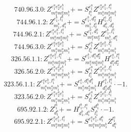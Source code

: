 \documentclass[letterpaper,10pt,fleqn,leqno,onecolumn]{article}
\begin{document}
\begin{equation} \;\;\;\;\;\;  740.96.3.0: Z^{e_{1}^{a}e_{2}^{a}e_{1}^{b}}_{m_{1}^{a}m_{2}^{a}m_{1}^{b}}+=S^{e_{1}^{a}}_{l_{1}^{a}}Z^{e_{2}^{a}e_{1}^{b},l_{1}^{a}}_{m_{1}^{a}m_{2}^{a}m_{1}^{b}} \end{equation}
\begin{equation} \;\;\;\;\;\;  744.96.1.2: Z^{e_{1}^{b},l_{1}^{a}}_{m_{1}^{b},d_{1}^{a}}+=S^{e_{1}^{b},d_{2}^{a}}_{m_{1}^{b},l_{2}^{a}}H^{l_{1}^{a},l_{2}^{a}}_{d_{1}^{a},d_{2}^{a}} \end{equation}
\begin{equation} \;\;\;\;\;\;  744.96.2.1: Z^{e_{1}^{a}e_{1}^{b},l_{1}^{a}}_{m_{1}^{a}m_{2}^{a}m_{1}^{b}}+=S^{e_{1}^{a},d_{1}^{a}}_{m_{1}^{a}m_{2}^{a}}Z^{e_{1}^{b},l_{1}^{a}}_{m_{1}^{b},d_{1}^{a}} \end{equation}
\begin{equation} \;\;\;\;\;\;  744.96.3.0: Z^{e_{1}^{a}e_{2}^{a}e_{1}^{b}}_{m_{1}^{a}m_{2}^{a}m_{1}^{b}}+=S^{e_{1}^{a}}_{l_{1}^{a}}Z^{e_{2}^{a}e_{1}^{b},l_{1}^{a}}_{m_{1}^{a}m_{2}^{a}m_{1}^{b}} \end{equation}
\begin{equation} \;\;\;\;\;\;  326.56.1.1: Z^{e_{1}^{a}e_{1}^{b},l_{1}^{a}}_{m_{1}^{a}m_{2}^{a}m_{1}^{b}}+=S^{e_{1}^{b},d_{1}^{a}d_{2}^{a}}_{m_{1}^{a}m_{2}^{a}m_{1}^{b}}H^{e_{1}^{a},l_{1}^{a}}_{d_{1}^{a}d_{2}^{a}} \end{equation}
\begin{equation} \;\;\;\;\;\;  326.56.2.0: Z^{e_{1}^{a}e_{2}^{a}e_{1}^{b}}_{m_{1}^{a}m_{2}^{a}m_{1}^{b}}+=S^{e_{1}^{a}}_{l_{1}^{a}}Z^{e_{2}^{a}e_{1}^{b},l_{1}^{a}}_{m_{1}^{a}m_{2}^{a}m_{1}^{b}} \end{equation}
\begin{equation} \;\;\;\;\;\;  323.56.1.1: Z^{e_{1}^{a}e_{1}^{b},l_{1}^{a}}_{m_{1}^{a}m_{2}^{a}m_{1}^{b}}+=S^{e_{1}^{a},d_{1}^{a}d_{1}^{b}}_{m_{1}^{a}m_{2}^{a}m_{1}^{b}}H^{e_{1}^{b},l_{1}^{a}}_{d_{1}^{a}d_{1}^{b}}\cdot -1. \end{equation}
\begin{equation} \;\;\;\;\;\;  323.56.2.0: Z^{e_{1}^{a}e_{2}^{a}e_{1}^{b}}_{m_{1}^{a}m_{2}^{a}m_{1}^{b}}+=S^{e_{1}^{a}}_{l_{1}^{a}}Z^{e_{2}^{a}e_{1}^{b},l_{1}^{a}}_{m_{1}^{a}m_{2}^{a}m_{1}^{b}} \end{equation}
\begin{equation} \;\;\;\;\;\;  695.92.1.2: Z^{l_{1}^{a}}_{d_{1}^{a}}+=H^{l_{1}^{b},l_{1}^{a}}_{d_{1}^{b},d_{1}^{a}}S^{d_{1}^{b}}_{l_{1}^{b}}\cdot -1. \end{equation}
\begin{equation} \;\;\;\;\;\;  695.92.2.1: Z^{e_{1}^{a}e_{1}^{b},l_{1}^{a}}_{m_{1}^{a}m_{2}^{a}m_{1}^{b}}+=S^{e_{1}^{a}e_{1}^{b},d_{1}^{a}}_{m_{1}^{a}m_{2}^{a}m_{1}^{b}}Z^{l_{1}^{a}}_{d_{1}^{a}} \end{equation}
\end{document}
